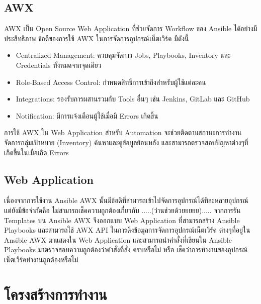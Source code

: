 \subsection{AWX}
\hspace{0.5in} AWX เป็น Open Source Web Application ที่ช่วยจัดการ Workflow ของ Ansible ได้อย่างมีประสิทธิภาพ ข้อดีของการใช้ AWX ในการจัดการอุปกรณ์เน็ตเวิร์ค มีดังนี้
\begin{itemize}
  \item Centralized Management: ควบคุมจัดการ Jobs, Playbooks, Inventory และ Credentials ทั้งหมดจากจุดเดียว
  \item Role-Based Access Control: กำหนดสิทธิ์การเข้าถึงสำหรับผู้ใช้แต่ละคน
  \item Integrations: รองรับการผสานรวมกับ Tools อื่นๆ เช่น Jenkins, GitLab และ GitHub
  \item Notification: มีการแจ้งเตือนผู้ใช้เมื่อมี Errors เกิดขึ้น
\end{itemize}
\hspace{0.5in} การใช้ AWX ใน Web Application สำหรับ Automation จะช่วยติดตามสถานะการทำงาน จัดการกลุ่มเป้าหมาย (Inventory) ค้นหาและดูข้อมูลย้อนหลัง และสามารถตรวจสอบปัญหาต่างๆที่เกิดขึ้นในเมื่อเกิด Errors

\subsection{Web Application}
\hspace{0.5in} เนื่องจากการใช้งาน Ansible AWX นั้นมีข้อดีที่สามารถเข้าไปจัดการอุปกรณ์ได้ทีละหลายอุปกรณ์ แต่ยังมีข้อจำกัดคือ ไม่สามารถเช็คความถูกต้องเกี่ยวกับ .....(ว่านช่วยด้วยยยยย)..... จากการรัน Templates บน Ansible AWX จึงออกแบบ Web Application ที่สามารถสร้าง Ansible Playbooks และสามารถใช้ AWX API ในการดึงข้อมูลการจัดการอุปกรณ์เน็ตเวิร์ค ต่างๆที่อยู่ใน Ansible AWX มาแสดงใน Web Application และสามารถนำคำสั่งที่เขียนใน Ansible Playbooks มาตรวจสอบความถูกต้องว่าคำสั่งที่สั่ง ครบหรือไม่ หรือ เช็คว่าการทำงานของอุปกรณ์ เน็ตเวิร์คทำงานถูกต้องหรือไม่

\section{โครงสร้างการทำงาน}